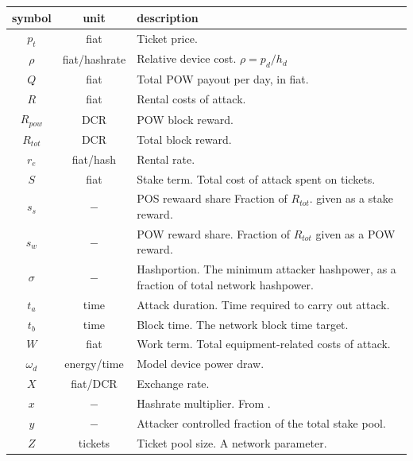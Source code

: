 \documentclass[a4paper,12pt]{article}
\begin{document}
\begin{appendices}
\begin{center}
  \begin{tabular}{ | c | c | l | }
    \hline
	\textbf{ symbol } & \textbf{ unit } & \textbf{ description } \\ \hline
	$ p_t $ & fiat & Ticket price. \\ \hline
	$ \rho $ & fiat/hashrate & Relative device cost. $\rho = p_d / h_d$ \\ \hline
	$ Q $ & fiat & Total POW payout per day, in fiat. \\ \hline
	$ R $ & fiat & Rental costs of attack. \\ \hline
	$ R_{pow} $ & DCR & POW block reward. \\ \hline
	$ R_{tot} $ & DCR & Total block reward. \\ \hline
	$ r_e $ & fiat/hash & Rental rate. \\ \hline
	$ S $ & fiat & Stake term. Total cost of attack spent on tickets. \\ \hline
	$ s_s $ & $ - $ & \makecell[l]{POS rewaard share Fraction of $R_{tot}$. given as a \\stake reward. }\\ \hline
	$ s_w $ & $ - $ & \makecell[l]{ POW reward share. Fraction of $R_{tot} $ given as a \\POW reward. }\\ \hline
	$ \sigma $ & $ - $ & \makecell[l]{ Hashportion. The minimum attacker hashpower, as a \\fraction of total network hashpower.} \\ \hline
	$ t_a $ & time & Attack duration. Time required to carry out attack. \\ \hline
	$ t_b $ & time & Block time. The network block time target. \\ \hline
	$ W $ & fiat & Work term. Total equipment-related costs of attack. \\ \hline
	$ \omega_d $ & energy/time & Model device power draw. \\ \hline
	$ X $ & fiat/DCR & Exchange rate. \\ \hline
	$ x $ & $ - $ & Hashrate multiplier. From \cite{POA}. \\ \hline
	$ y $ & $ - $ & Attacker controlled fraction of the total stake pool. \\ \hline
	$ Z $ & tickets & Ticket pool size. A network parameter. \\ \hline
  \end{tabular}
\end{center}




\end{appendices}
\end{document}
